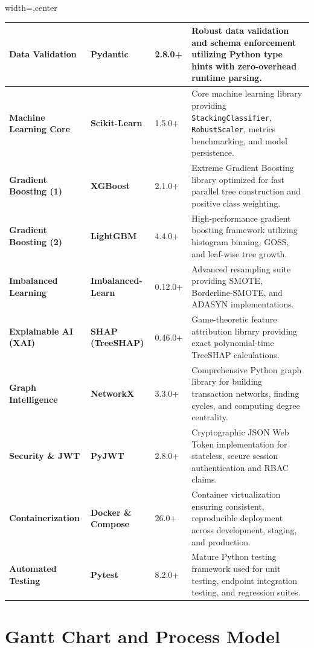 \documentclass[12pt,a4paper,oneside]{report}
\begin{document}
\begin{table}[H]
\begin{adjustbox}{width=\textwidth,center}
\begin{tabular}{| l | l | l | l |}
\rowcolor{tablealt} \textbf{Data Validation} & \textbf{Pydantic} & 2.8.0+ & Robust data validation and schema enforcement utilizing Python type hints with zero-overhead runtime parsing. \\ \hline
\textbf{Machine Learning Core} & \textbf{Scikit-Learn} & 1.5.0+ & Core machine learning library providing \texttt{StackingClassifier}, \texttt{RobustScaler}, metrics benchmarking, and model persistence. \\ \hline
\rowcolor{tablealt} \textbf{Gradient Boosting (1)} & \textbf{XGBoost} & 2.1.0+ & Extreme Gradient Boosting library optimized for fast parallel tree construction and positive class weighting. \\ \hline
\textbf{Gradient Boosting (2)} & \textbf{LightGBM} & 4.4.0+ & High-performance gradient boosting framework utilizing histogram binning, GOSS, and leaf-wise tree growth. \\ \hline
\rowcolor{tablealt} \textbf{Imbalanced Learning} & \textbf{Imbalanced-Learn} & 0.12.0+ & Advanced resampling suite providing SMOTE, Borderline-SMOTE, and ADASYN implementations. \\ \hline
\textbf{Explainable AI (XAI)} & \textbf{SHAP (TreeSHAP)} & 0.46.0+ & Game-theoretic feature attribution library providing exact polynomial-time TreeSHAP calculations. \\ \hline
\rowcolor{tablealt} \textbf{Graph Intelligence} & \textbf{NetworkX} & 3.3.0+ & Comprehensive Python graph library for building transaction networks, finding cycles, and computing degree centrality. \\ \hline
\textbf{Security \& JWT} & \textbf{PyJWT} & 2.8.0+ & Cryptographic JSON Web Token implementation for stateless, secure session authentication and RBAC claims. \\ \hline
\rowcolor{tablealt} \textbf{Containerization} & \textbf{Docker \& Compose} & 26.0+ & Container virtualization ensuring consistent, reproducible deployment across development, staging, and production. \\ \hline
\textbf{Automated Testing} & \textbf{Pytest} & 8.2.0+ & Mature Python testing framework used for unit testing, endpoint integration testing, and regression suites. \\ \hline
\end{tabular}
\end{adjustbox}
\end{table}


\section{Gantt Chart and Process Model}
\end{document}
